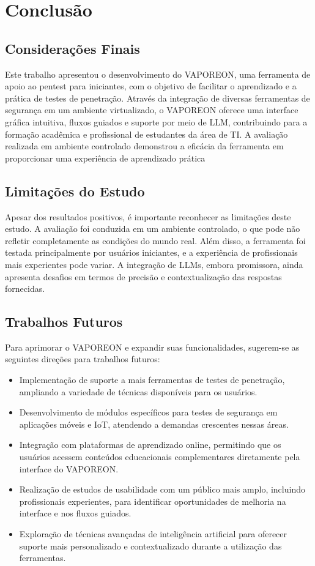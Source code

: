 \chapter{Conclusão}
\label{chp:conclusao}

\section{Considerações Finais}
    Este trabalho apresentou o desenvolvimento do VAPOREON, uma ferramenta de apoio ao pentest para iniciantes,
    com o objetivo de facilitar o aprendizado e a prática de testes de penetração. Através da integração de diversas 
    ferramentas de segurança em um ambiente virtualizado, o VAPOREON oferece uma interface gráfica intuitiva, 
    fluxos guiados e suporte por meio de LLM, contribuindo para a formação acadêmica e profissional de estudantes da área de
    TI. A avaliação realizada em ambiente controlado demonstrou a eficácia da ferramenta em proporcionar uma experiência de
    aprendizado prática

\section{Limitações do Estudo}
    Apesar dos resultados positivos, é importante reconhecer as limitações deste estudo. A avaliação foi conduzida 
    em um ambiente controlado, o que pode não refletir completamente as condições do mundo real. Além disso, a 
    ferramenta foi testada principalmente por usuários iniciantes, e a experiência de profissionais mais experientes 
    pode variar. A integração de LLMs, embora promissora, ainda apresenta desafios em termos de precisão e contextualização
    das respostas fornecidas.

\section{Trabalhos Futuros}
    Para aprimorar o VAPOREON e expandir suas funcionalidades, sugerem-se as seguintes direções para trabalhos futuros:
    \begin{itemize}
        \item Implementação de suporte a mais ferramentas de testes de penetração, ampliando a variedade de técnicas disponíveis para os usuários.
        \item Desenvolvimento de módulos específicos para testes de segurança em aplicações móveis e IoT, atendendo a demandas crescentes nessas áreas.
        \item Integração com plataformas de aprendizado online, permitindo que os usuários acessem conteúdos educacionais complementares diretamente pela interface do VAPOREON.
        \item Realização de estudos de usabilidade com um público mais amplo, incluindo profissionais experientes, para identificar oportunidades de melhoria na interface e nos fluxos guiados.
        \item Exploração de técnicas avançadas de inteligência artificial para oferecer suporte mais personalizado e contextualizado durante a utilização das ferramentas.
    \end{itemize}